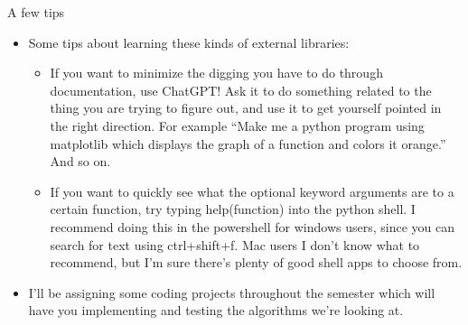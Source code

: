 \documentclass{beamer}
\begin{document}
\begin{frame}{A few tips}
    \begin{itemize}
        \item Some tips about learning these kinds of external libraries:
        \begin{itemize}
            \item If you want to minimize the digging you have to do through documentation, use ChatGPT! Ask it to do something related to the thing you are trying to figure out, and use it to get yourself pointed in the right direction. For example ``Make me a python program using matplotlib which displays the graph of a function and colors it orange.'' And so on. 
            \item If you want to quickly see what the optional keyword arguments are to a certain function, try typing help(function) into the python shell. I recommend doing this in the powershell for windows users, since you can search for text using ctrl+shift+f. Mac users I don't know what to recommend, but I'm sure there's plenty of good shell apps to choose from. 
        \end{itemize}
        \item I'll be assigning some coding projects throughout the semester which will have you implementing and testing the algorithms we're looking at. 
    \end{itemize}
\end{frame}
\end{document}
